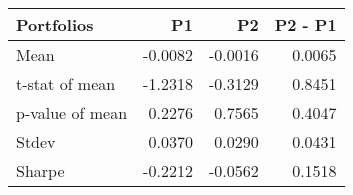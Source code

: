 \begin{tabular}{lrrr}
\toprule
Portfolios & P1 & P2 & P2 - P1 \\
\midrule
Mean & -0.0082 & -0.0016 & 0.0065 \\
t-stat of mean & -1.2318 & -0.3129 & 0.8451 \\
p-value of mean & 0.2276 & 0.7565 & 0.4047 \\
Stdev & 0.0370 & 0.0290 & 0.0431 \\
Sharpe & -0.2212 & -0.0562 & 0.1518 \\
\bottomrule
\end{tabular}
